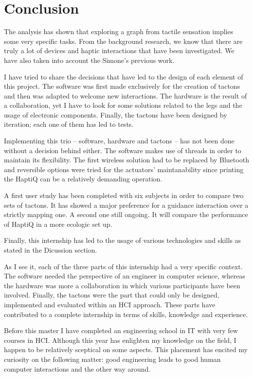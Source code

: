 \chapter{Conclusion}

The analysis has shown that exploring a graph from tactile sensation implies some very specific tasks. From the background research, we know that there are truly a lot of devices and haptic interactions that have been investigated. We have also taken into account the Simone's previous work.

I have tried to share the decisions that have led to the design of each element of this project. The software was first made exclusively for the creation of tactons and then was adapted to welcome new interactions. The hardware is the result of a collaboration, yet I have to look for some solutions related to the legs and the usage of electronic components. Finally, the tactons have been designed by iteration; each one of them has led to tests.

Implementing this trio -- software, hardware and tactons -- has not been done without a decision behind either. The software makes use of threads in order to maintain its flexibility. The first wireless solution had to be replaced by Bluetooth and reversible options were tried for the actuators' maintanability since printing the HaptiQ can be a relatively demanding operation.

A first user study has been completed with six subjects in order to compare two sets of tactons. It has showed a major preference for a guidance interaction over a strictly mapping one. A second one still ongoing. It will compare the performance of HaptiQ in a more ecologic set up.

Finally, this internship has led to the usage of various technologies and skills as stated in the Dicussion section.

As I see it, each of the three parts of this internship had a very specific context. The software needed the perspective of an engineer in computer science, whereas the hardware was more a collaboration in which various participants have been involved. Finally, the tactons were the part that could only be designed, implemented and evaluated within an HCI approach. These parts have contributed to a complete internship in terms of skills, knowledge and experience.

Before this master I have completed an engineering school in IT with very few courses in HCI. Although this year has enlighten my knowledge on the field, I happen to be relatively sceptical on some aspects. This placement has encited my curiosity on the following matter: good engineering leads to good human computer interactions and the other way around.
